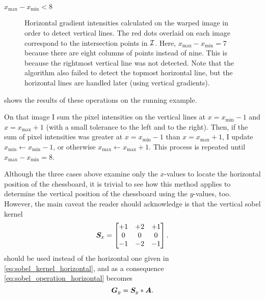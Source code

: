 \documentclass[../report.tex]{subfiles}
\begin{document}
\begin{caselist}
\begin{case}{$x_\text{max}-x_\text{min}<8$}
\begin{figure}
            \caption[Horizontal gradient intensities calculated on the warped image in order to detect vertical lines.]{Horizontal gradient intensities calculated on the warped image in order to detect vertical lines. The red dots overlaid on each image correspond to the intersection points in ${\mathcal{I}}$. Here, $x_\text{max}-x_\text{min}=7$ because there are eight columns of points instead of nine. This is because the rightmost vertical line was not detected. Note that the algorithm also failed to detect the topmost horizontal line, but the horizontal lines are handled later (using vertical gradients).}
            \label{fig:warped_image_gradients}
        \end{figure}
         shows the results of these operations on the running example.

        On that image I sum the pixel intensities on the vertical lines at $x=x_\text{min}-1$ and $x=x_\text{max}+1$ (with a small tolerance to the left and to the right).
        Then, if the sum of pixel intensities was greater at $x=x_\text{min}-1$ than $x=x_\text{max}+1$, I update $x_\text{min} \gets x_\text{min}-1$, or otherwise $x_\text{max} \gets x_\text{max}+1$.
        This process is repeated until $x_\text{max}-x_\text{min}=8$.
    \end{case}
\end{caselist}

Although the three cases above examine only the $x$-values to locate the horizontal position of the chessboard, it is trivial to see how this method applies to determine the vertical position of the chessboard using the $y$-values, too.
However, the main caveat the reader should acknowledge is that the vertical sobel kernel
\begin{equation}
    {\bm{S}}_x = \begin{bmatrix}
        +1 & +2 & +1\\
        0 & 0 & 0\\
        -1 & -2 & -1\\
    \end{bmatrix}.
\end{equation}
should be used instead of the horizontal one given in \cref{eq:sobel_kernel_horizontal}, and as a consequence \cref{eq:sobel_operation_horizontal} becomes
\begin{equation}
    {\bm{G}}_y = {\bm{S}}_y * {\bm{A}}.
\end{equation}
\end{document}
